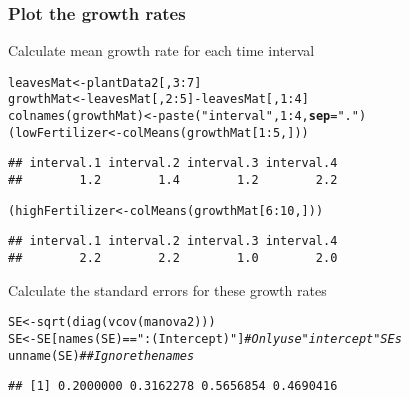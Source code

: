 \documentclass[color=usenames,dvipsnames]{beamer}\usepackage[]{graphicx}\usepackage[]{color}
\makeatletter
\newcommand{\hlnum}[1]{\textcolor[rgb]{0.69,0.494,0}{#1}}%
\newcommand{\hlstr}[1]{\textcolor[rgb]{0.749,0.012,0.012}{#1}}%
\newcommand{\hlcom}[1]{\textcolor[rgb]{0.514,0.506,0.514}{\textit{#1}}}%
\newcommand{\hlopt}[1]{\textcolor[rgb]{0,0,0}{#1}}%
\newcommand{\hlstd}[1]{\textcolor[rgb]{0,0,0}{#1}}%
\newcommand{\hlkwb}[1]{\textcolor[rgb]{0,0.341,0.682}{#1}}%
\newcommand{\hlkwc}[1]{\textcolor[rgb]{0,0,0}{\textbf{#1}}}%
\newcommand{\hlkwd}[1]{\textcolor[rgb]{0.004,0.004,0.506}{#1}}%
\newenvironment{kframe}{%
 \def\at@end@of@kframe{}%
 \ifinner\ifhmode%
  \def\at@end@of@kframe{\end{minipage}}%
  \begin{minipage}{\columnwidth}%
 \fi\fi%
 \def\FrameCommand##1{\hskip\@totalleftmargin \hskip-\fboxsep
 \colorbox{shadecolor}{##1}\hskip-\fboxsep
     \hskip-\linewidth \hskip-\@totalleftmargin \hskip\columnwidth}%
 \MakeFramed {\advance\hsize-\width
   \@totalleftmargin\z@ \linewidth\hsize
   \@setminipage}}%
 {\par\unskip\endMakeFramed%
 \at@end@of@kframe}
\newenvironment{knitrout}{}{} %
\makeatother
\begin{document}
\begin{frame}[fragile]
  \frametitle{Plot the growth rates}
  \small
  {%
    Calculate mean growth rate for each time interval}%
  \pause
\begin{knitrout}\footnotesize
{}\color{fgcolor}\begin{kframe}
\begin{alltt}
\hlstd{leavesMat} \hlkwb{<-} \hlstd{plantData2[,}\hlnum{3}\hlopt{:}\hlnum{7}\hlstd{]}
\hlstd{growthMat} \hlkwb{<-} \hlstd{leavesMat[,}\hlnum{2}\hlopt{:}\hlnum{5}\hlstd{]} \hlopt{-} \hlstd{leavesMat[,}\hlnum{1}\hlopt{:}\hlnum{4}\hlstd{]}
\hlkwd{colnames}\hlstd{(growthMat)} \hlkwb{<-} \hlkwd{paste}\hlstd{(}\hlstr{"interval"}\hlstd{,} \hlnum{1}\hlopt{:}\hlnum{4}\hlstd{,} \hlkwc{sep}\hlstd{=}\hlstr{"."}\hlstd{)}
\hlstd{(lowFertilizer} \hlkwb{<-} \hlkwd{colMeans}\hlstd{(growthMat[}\hlnum{1}\hlopt{:}\hlnum{5}\hlstd{,]))}
\end{alltt}
\begin{verbatim}
## interval.1 interval.2 interval.3 interval.4 
##        1.2        1.4        1.2        2.2
\end{verbatim}
\begin{alltt}
\hlstd{(highFertilizer} \hlkwb{<-} \hlkwd{colMeans}\hlstd{(growthMat[}\hlnum{6}\hlopt{:}\hlnum{10}\hlstd{,]))}
\end{alltt}
\begin{verbatim}
## interval.1 interval.2 interval.3 interval.4 
##        2.2        2.2        1.0        2.0
\end{verbatim}
\end{kframe}
\end{knitrout}
\pause
{Calculate the standard errors for these growth rates}
\footnotesize
\begin{knitrout}\footnotesize
{}\color{fgcolor}\begin{kframe}
\begin{alltt}
\hlstd{SE} \hlkwb{<-} \hlkwd{sqrt}\hlstd{(}\hlkwd{diag}\hlstd{(}\hlkwd{vcov}\hlstd{(manova2)))}
\hlstd{SE} \hlkwb{<-} \hlstd{SE[}\hlkwd{names}\hlstd{(SE)}\hlopt{==}\hlstr{":(Intercept)"}\hlstd{]} \hlcom{# Only use "intercept" SEs}
\hlkwd{unname}\hlstd{(SE)} \hlcom{## Ignore the names}
\end{alltt}
\begin{verbatim}
## [1] 0.2000000 0.3162278 0.5656854 0.4690416
\end{verbatim}
\end{kframe}
\end{knitrout}
\end{frame}
\end{document}
